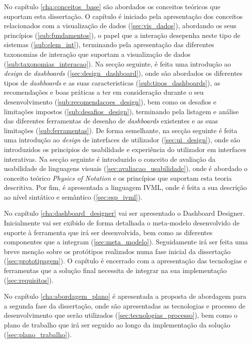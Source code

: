 No capítulo \ref{cha:conceitos_base} são abordados os conceitos teóricos que suportam esta dissertação. O capítulo é iniciado pela apresentação dos conceitos relacionados com a visualização de dados (\ref{sec:vis_dados}), abordando os seus princípios (\ref{sub:fundamentos}), o papel que a interação desepenha neste tipo de sistemas (\ref{sub:elem_int}), terminando pela apresentação das diferentes taxonomias de interação que suportam a visualização de dados (\ref{sub:taxonomias_interacao}). Na secção seguinte, é feita uma introdução ao \textit{design} de \textit{dashboards} (\ref{sec:design_dashboard}), onde são abordados os diferentes tipos de \textit{dashboards} e as suas caracteristicas (\ref{sub:tipos_dashboards}), as recomendações e boas práticas a ter em consideração durante o seu desenvolvimento (\ref{sub:recomendacoes_design}), bem como os desafios e limitações impostos (\ref{sub:desafios_design}), terminando pela listagem e análise das diferentes ferramentas de desenho de \textit{dashboards} existentes e as suas limitações (\ref{sub:ferramentas}). De forma semelhante, na secção seguinte é feita uma introdução ao \textit{design} de interfaces de utilizador (\ref{sec:ui_design}), onde são introduzidos os principios de usabilidade e experiência do utilizador em interfaces interativas. Na secção seguinte é introduzido o conceito de avaliação da usabilidade de linguagens visuais (\ref{sec:avaliacao_usabilidade}), onde é abordado o conceito teórico \textit{Physics of Notation} e os princípios que suportam esta teoria descritiva. Por fim, é apresentada a linguagem IVML, onde é feita a sua descrição ao nível sintático e semântico (\ref{sec:esp_ivml}).

No capítulo \ref{cha:dashboard_designer} vai ser apresentado o Dashboard Designer. Inicialmente vai ser exibido de forma detalhada o meta-modelo desenvolvido de suporte à ferramenta que irá ser desenvolvida, bem como as diferentes componentes que a integram (\ref{sec:meta_modelo}). Seguidamente irá ser feita uma breve menção sobre os protótipos realizados numa fase inicial da dissertação (\ref{sec:prototipagem}). O capítulo é encerrado com a apresentação das tecnologias e ferramentas que a solução final necessita de integrar na sua implementação (\ref{sec:requisitos}).

No capítulo \ref{cha:abordagem_plano} é apresentada a proposta de abordagem para a segunda fase da dissertação, onde são apresentadas as tecnologias e processo de desenvolvimento que serão utilizados (\ref{sec:tecnologias_processo}), bem como o plano de trabalho que irá ser seguido ao longo da implementação da solução (\ref{sec:plano_trabalho}). 


